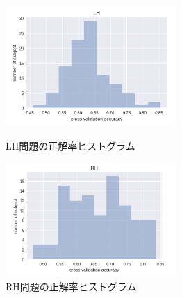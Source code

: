 \begin{figure}[t]
    \begin{minipage}{0.5\hsize}
     \begin{center}
      \includegraphics[width=65mm]{images/LH.png}
     \end{center}
     \caption{LH問題の正解率ヒストグラム}
     \label{fig:LHhist}
    \end{minipage}
    \begin{minipage}{0.5\hsize}
     \begin{center}
      \includegraphics[width=65mm]{images/RH.png}
     \end{center}
     \caption{RH問題の正解率ヒストグラム}
     \label{fig:RHhist}
    \end{minipage}
\end{figure}
